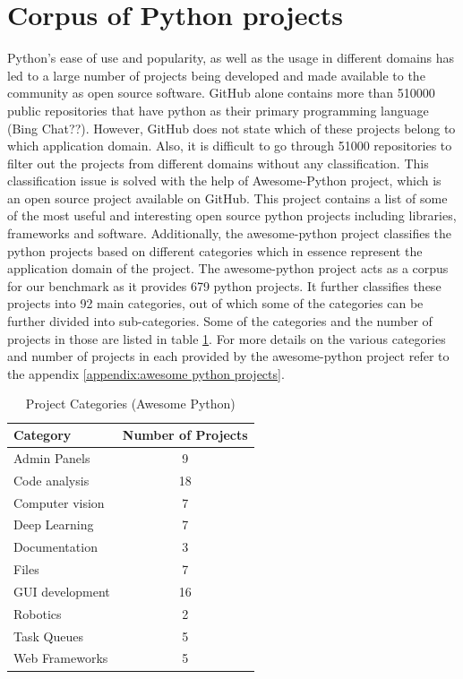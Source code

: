\section{Corpus of Python projects}
\label{approach:corpus of python projects}
Python's ease of use and popularity, as well as the usage in different domains has led to a large number of projects being developed and made available to the community as open source software. GitHub alone contains more than 510000 public repositories that have python as their primary programming language \cite{bing_chat}(Bing Chat??). However, GitHub does not state which of these projects belong to which application domain. Also, it is difficult to go through 51000 repositories to filter out the projects from different domains without any classification.
This classification issue is solved with the help of Awesome-Python project, which is an open source project available on GitHub. This project contains a list of some of the most useful and interesting open source python projects including libraries, frameworks and software. Additionally, the awesome-python project classifies the python projects based on different categories which in essence represent the application domain of the project.
The awesome-python project acts as a corpus for our benchmark as it provides 679 python projects. It further classifies these projects into 92 main categories, out of which some of the categories can be further divided into sub-categories. Some of the categories and the number of projects in those are listed in table \ref{table:awesome-python}. For more details on the various categories and number of projects in each provided by the awesome-python project refer to the appendix \ref{appendix:awesome python projects}.

\begin{table}[ht]
    \centering
    \begin{tabular}{lc}
    \hline
    \textbf{Category} & \textbf{Number of Projects}\\
    \hline
    Admin Panels    & 9\\
    Code analysis   & 18\\
    Computer vision & 7\\
    Deep Learning   & 7\\
    Documentation   & 3\\
    Files   & 7\\
    GUI development & 16\\
    Robotics    & 2\\
    Task Queues & 5\\
    Web Frameworks  & 5\\
    \hline
    \end{tabular}
    \caption{Project Categories (Awesome Python)}
    \label{table:awesome-python}
\end{table}


